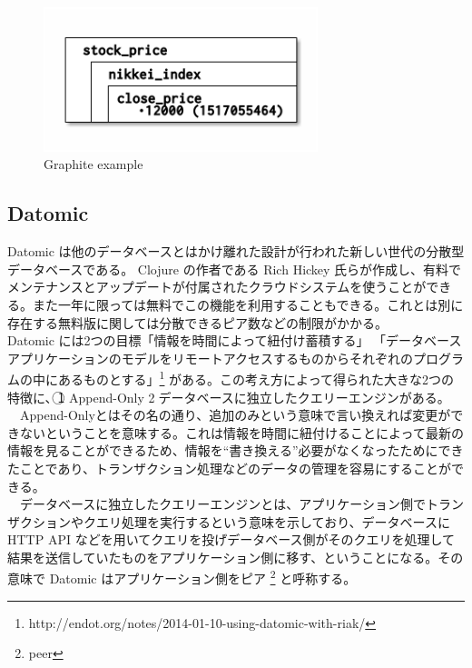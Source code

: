 \documentclass{scrartcl}
\begin{document}
\begin{figure}[htbp]
\centering
\includegraphics[width=8cm]{hoge.png}
\caption{Graphite example}
\end{figure}

\subsection{Datomic}
\label{sec:org3e07093}
 Datomic は他のデータベースとはかけ離れた設計が行われた新しい世代の分散型データベースである。 Clojure の作者である Rich Hickey 氏らが作成し、有料でメンテナンスとアップデートが付属されたクラウドシステムを使うことができる。また一年に限っては無料でこの機能を利用することもできる。これとは別に存在する無料版に関しては分散できるピア数などの制限がかかる。\\
  Datomic には2つの目標「情報を時間によって紐付け蓄積する」 「データベースアプリケーションのモデルをリモートアクセスするものからそれぞれのプログラムの中にあるものとする」\footnote{http://endot.org/notes/2014-01-10-using-datomic-with-riak/} がある。この考え方によって得られた大きな2つの特徴に、\textcircled{\scriptsize 1} Append-Only \textcircled{\scriptsize 2}データベースに独立したクエリーエンジンがある。\\
　Append-Onlyとはその名の通り、追加のみという意味で言い換えれば変更ができないということを意味する。これは情報を時間に紐付けることによって最新の情報を見ることができるため、情報を``書き換える''必要がなくなったためにできたことであり、トランザクション処理などのデータの管理を容易にすることができる。\\
　データベースに独立したクエリーエンジンとは、アプリケーション側でトランザクションやクエリ処理を実行するという意味を示しており、データベースに HTTP API などを用いてクエリを投げデータベース側がそのクエリを処理して結果を送信していたものをアプリケーション側に移す、ということになる。その意味で Datomic はアプリケーション側をピア \footnote{peer} と呼称する。\\
\end{document}
